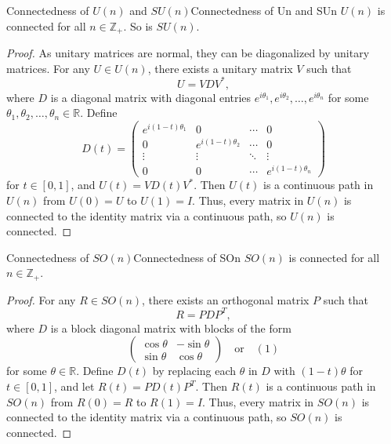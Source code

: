 \documentclass[../main.tex]{subfiles}
\begin{document}
\begin{proposition}{Connectedness of $U(n)$ and $SU(n)$}{Connectedness of Un and SUn}
	$U(n)$ is connected for all $n \in \mathbb{Z}_+$. So is $SU(n)$.	
\end{proposition}
\begin{proof}
	As unitary matrices are normal, they can be diagonalized by unitary matrices. For any $U \in U(n)$, there exists a unitary matrix $V$ such that
	\begin{equation*}
		U = V D V^*,
	\end{equation*}
	where $D$ is a diagonal matrix with diagonal entries $e^{i \theta_1}, e^{i \theta_2}, \ldots , e^{i \theta_n}$ for some $\theta_1, \theta_2, \ldots , \theta_n \in \mathbb{R}$. Define
	\begin{equation*}
		D(t) = \begin{pmatrix}
			e^{i (1-t) \theta_1} & 0                   & \cdots & 0                   \\
			0                   & e^{i (1-t) \theta_2} & \cdots & 0                   \\
			\vdots
					    & \vdots              & \ddots & \vdots              \\
			0                   & 0                   & \cdots & e^{i (1-t) \theta_n}
		\end{pmatrix}
	\end{equation*}
	for $t \in [0,1]$, and $U(t) = V D(t) V^*$. Then $U(t)$ is a continuous path in $U(n)$ from $U(0) = U$ to $U(1) = I$. Thus, every matrix in $U(n)$ is connected to the identity matrix via a continuous path, so $U(n)$ is connected.
\end{proof}

\begin{proposition}{Connectedness of $SO(n)$}{Connectedness of SOn}
	$SO(n)$ is connected for all $n \in \mathbb{Z}_+$.
\end{proposition}
\begin{proof}
	For any $R \in SO(n)$, there exists an orthogonal matrix $P$ such that
	\begin{equation*}
		R = P D P^T,
	\end{equation*}
	where $D$ is a block diagonal matrix with blocks of the form
	\begin{equation*}
		\begin{pmatrix}
			\cos \theta & -\sin \theta \\
			\sin \theta & \cos \theta
		\end{pmatrix}
		\quad \text{or} \quad
		(1)
	\end{equation*}
	for some $\theta \in \mathbb{R}$. Define $D(t)$ by replacing each $\theta$ in $D$ with $(1-t) \theta$ for $t \in [0,1]$, and let $R(t) = P D(t) P^T$. Then $R(t)$ is a continuous path in $SO(n)$ from $R(0) = R$ to $R(1) = I$. Thus, every matrix in $SO(n)$ is connected to the identity matrix via a continuous path, so $SO(n)$ is connected.
\end{proof}
\end{document}
